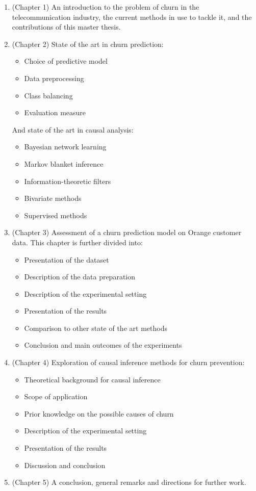 \begin{enumerate}
	\item (Chapter 1) An introduction to the problem of churn in the
	telecommunication industry, the current methods in use to tackle it, and the
	contributions of this master thesis.

    \item (Chapter 2) State of the art in churn prediction:
    \begin{itemize}
        \item Choice of predictive model
        \item Data preprocessing
        \item Class balancing
        \item Evaluation measure
    \end{itemize}
    And state of the art in causal analysis:
    \begin{itemize}
        \item Bayesian network learning
        \item Markov blanket inference
        \item Information-theoretic filters
        \item Bivariate methods
        \item Supervised methods
    \end{itemize}

	\item (Chapter 3) Assessment of a churn prediction model on Orange customer
	data. This chapter is further divided into:
	\begin{itemize}
		\item Presentation of the dataset
		\item Description of the data preparation
		\item Description of the experimental setting
		\item Presentation of the results
        \item Comparison to other state of the art methods
		\item Conclusion and main outcomes of the experiments
	\end{itemize}

    \item (Chapter 4) Exploration of causal inference methods for churn
    prevention:
    \begin{itemize}
        \item Theoretical background for causal inference
        \item Scope of application
        \item Prior knowledge on the possible causes of churn
        \item Description of the experimental setting
        \item Presentation of the results
        \item Discussion and conclusion
    \end{itemize}

    \item (Chapter 5) A conclusion, general remarks and directions for further work.
\end{enumerate}

